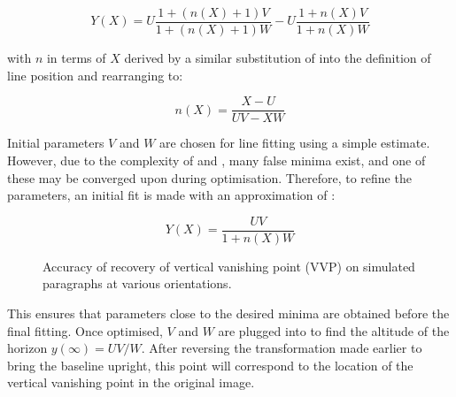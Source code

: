 \begin{equation}
Y(X) = U \frac{1+(n(X)+1)V}{1+(n(X)+1)W} - U \frac{1+n(X)V}{1+n(X)W}
\label{fittingeqn}
\end{equation}

{\parindent 0mm
with $n$ in terms of $X$ derived by a similar substitution of  into the definition of line position  and rearranging to:
}

\begin{equation}
n(X) = \frac{X-U}{UV-XW}
\label{nfromxeqn}
\end{equation}

Initial parameters $V$ and $W$ are chosen for line fitting using a simple estimate. %
However, due to the complexity of  and , many false minima exist, and one of these may be converged upon during optimisation.
Therefore, to refine the parameters, an initial fit is made with an approximation of :

\begin{equation}
Y(X) = \frac{ UV }{ 1+n(X)W }
\end{equation}

\begin{figure}[t]
\begin{centering}
  \hspace{2mm}
  \hspace{2mm}
  \hspace{2mm}
\caption{Accuracy of recovery of vertical vanishing point (VVP) on simulated paragraphs at various orientations.}
\label{vvpaccuracy}
\end{centering}
\end{figure}

This ensures that parameters close to the desired minima are obtained before the final fitting.  Once optimised, $V$ and $W$ are plugged into  to find the altitude of the horizon $y(\infty) = UV/W$.
After reversing the transformation made earlier to bring the baseline upright, this point will correspond to the location of the vertical vanishing point in the original image.

